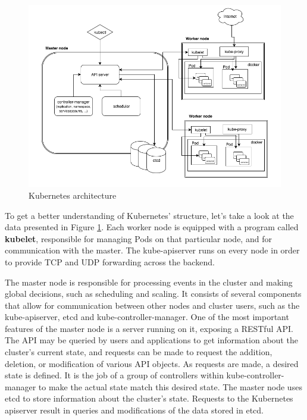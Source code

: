 \begin{figure}[!ht]
    \centering
    \includegraphics[width=1\textwidth, angle=0]{img/architecture.png}
    \caption{Kubernetes architecture~\cite{arch}}
    \label{fig:arch}
\end{figure}

To get a better understanding of Kubernetes' structure, let’s take a look at the data presented
in Figure \ref{fig:arch}. Each worker node is equipped with a program called \textbf{kubelet},
responsible for managing Pods on that particular node, and for communication with the master. The
kube-apiserver runs on every node in order to provide TCP and UDP forwarding across the backend.

The master node is responsible for processing events in the cluster and making global decisions,
such as scheduling and scaling. It consists of several components that allow for communication
between other nodes and cluster users, such as the kube-apiserver, etcd and kube-controller-manager.
One of the most important features of the master node is a server running on it, exposing a RESTful
API. The API may be queried by users and applications to get information about the cluster’s current
state, and requests can be made to request the addition, deletion, or modification of various API
objects. As requests are made, a desired state is defined. It is the job of a group of controllers
within kube-controller-manager to make the actual state match this desired state. The master node
uses etcd to store information about the cluster’s state. Requests to the Kubernetes apiserver
result in queries and modifications of the data stored in etcd.

